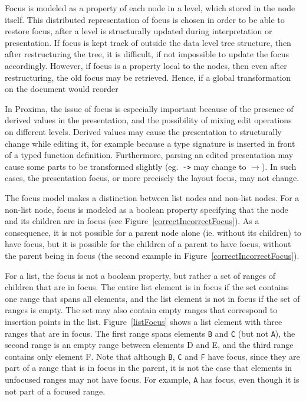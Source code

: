 Focus is modeled as a property of each node in a level, which stored in the node itself. This distributed representation of focus is chosen in order to be able to restore focus, after a level is structurally updated during interpretation or presentation. If focus is kept track of outside the data level tree structure, then after restructuring the tree, it is difficult, if not impossible to update the focus accordingly. However, if focus is a property local to the nodes, then even after restructuring, the old focus may be retrieved. Hence, if a global transformation on the document would reorder 

In Proxima, the issue of focus is especially important because of the presence of derived values in the presentation, and the possibility of mixing edit operations on different levels. Derived values may cause the presentation to structurally change while editing it, for example because a type signature is inserted in front of a typed function definition. Furthermore, parsing an edited presentation may cause some parts to be transformed slightly (eg.\ \verb|->| may change to $\rightarrow$). In such cases, the presentation focus, or more precisely the layout focus, may not change.

The focus model makes a distinction between list nodes and non-list nodes. For a non-list node, focus is modeled as a boolean property specifying that the node and its children are in focus (see Figure~\ref{correctIncorrectFocus}). As a consequence, it is not possible for a parent node alone (ie. without its children) to have focus, but it is possible for the children of a parent to have focus, without the parent being in focus (the second example in Figure~\ref{correctIncorrectFocus}).

For a list, the focus is not a boolean property, but rather a set of ranges of children that are in focus. The entire list element is in focus if the set contains one range that spans all elements, and the list element is not in focus if the set of ranges is empty. The set may also contain empty ranges that correspond to insertion points in the list. Figure~\ref{listFocus} shows a list element with three ranges that are in focus. The first range spans elements \verb|B| and \verb|C| (but not \verb|A|), the second range is an empty range between elements D and E, and the third range contains only element F. Note that although \verb|B|, \verb|C| and \verb|F| have focus, since they are part of a range that is in focus in the parent, it is not the case that elements in unfocused ranges may not have focus. For example, \verb|A| has focus, even though it is not part of a focused range. 

